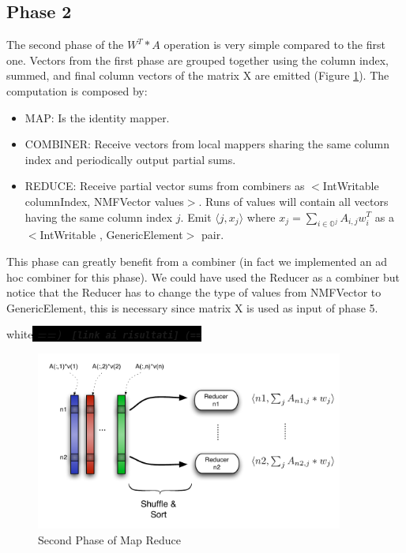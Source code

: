 \documentclass[a4paper,12pt]{article}
\newcommand{\commento}[1]{\begin{color}{white}\colorbox{black}{
	\textit{\textbf{==) \texttt{ [#1] (==}}}}\end{color}
}
\begin{document}

\subsection{Phase 2}
\label{sec:phase2}

The second phase of the $W^T*A$ operation is very simple compared to the first one.
Vectors from the first phase are grouped together using the column index, summed, and final column vectors of the matrix X are emitted (Figure \ref{fig:Map2}).
The computation is composed by:
\begin{itemize}
          \item MAP: Is the identity mapper.
			\item COMBINER: Receive vectors from local mappers sharing the same column index and periodically output partial sums.
          \item REDUCE: Receive partial vector sums from combiners as $<$IntWritable columnIndex, NMFVector values$>$. 
          Runs of values will contain all vectors having the same column index $j$. 
          Emit $\langle j, x_j \rangle$ where $ x_j = \sum_{i \in \mathbb{O}^j} A_{i,j}  w_{i}^{T} $ as a $<$IntWritable , GenericElement$>$ pair.
\end{itemize}
This phase can greatly benefit from a combiner (in fact we implemented an ad hoc combiner for this phase).
We could have used the Reducer as a combiner but notice that the Reducer has to change the type of values from NMFVector to GenericElement, this is necessary since matrix X is used as input of phase 5.
\commento{link ai risultati}

\begin{center}
	\begin{figure}[h]
	\centering
	\includegraphics[width=0.9\textwidth]{./figures/Map2}
	\caption{Second Phase of Map Reduce}
	\label{fig:Map2}
	\end{figure}
\end{center}
\end{document}
